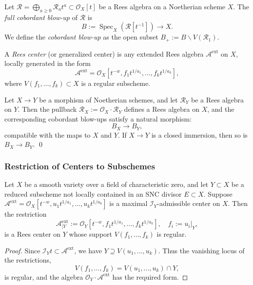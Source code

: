 \documentclass{amsart}
\newcommand{\ext}{{\operatorname{ext}}}
\newcommand{\Spec}{\operatorname{Spec}}
\renewcommand{\setminus}{\smallsetminus}
\begin{document}
\begin{definition}
Let $\mathcal{R} = \bigoplus_{a \geq 0} \mathcal{R}_a t^a \subset \mathcal{O}_X[t]$ be a Rees algebra on a Noetherian scheme $X$. The \emph{full cobordant blow-up} of $\mathcal{R}$ is
\[
B := \Spec_X(\mathcal{R}[t^{-1}]) \to X.
\]
We define the \emph{cobordant blow-up} as the open subset $B_+ := B \setminus V(\mathcal{R}_1)$.
\end{definition}

\begin{definition}
A \emph{Rees center} (or generalized center) is any extended Rees algebra $\mathcal{A}^{\ext}$ on $X$, locally generated in the form
\[
\mathcal{A}^{\ext} = \mathcal{O}_X[t^{-w}, f_1 t^{1/a_1}, \ldots, f_k t^{1/a_k}],
\]
where $V(f_1, \ldots, f_k) \subset X$ is a regular subscheme.
\end{definition}

\begin{lemma}
Let $X \to Y$ be a morphism of Noetherian schemes, and let $\mathcal{R}_Y$ be a Rees algebra on $Y$. Then the pullback $\mathcal{R}_X := \mathcal{O}_X \cdot \mathcal{R}_Y$ defines a Rees algebra on $X$, and the corresponding cobordant blow-ups satisfy a natural morphism:
\[
B_X \to B_Y,
\]
compatible with the maps to $X$ and $Y$. If $X \to Y$ is a closed immersion, then so is $B_X \to B_Y$. \qed
\end{lemma}

\subsubsection{Restriction of Centers to Subschemes}

\begin{lemma}
Let $X$ be a smooth variety over a field of characteristic zero, and let $Y \subset X$ be a reduced subscheme not locally contained in an SNC divisor $E \subset X$. Suppose $\mathcal{A}^{\ext} = \mathcal{O}_X[t^{-w}, u_1 t^{1/a_1}, \ldots, u_k t^{1/a_k}]$ is a maximal $\mathcal{I}_Y$-admissible center on $X$. Then the restriction
\[
\mathcal{A}^{\ext}_{|Y} := \mathcal{O}_Y[t^{-w}, f_1 t^{1/a_1}, \ldots, f_k t^{1/a_k}], \quad f_i := u_i|_Y,
\]
is a Rees center on $Y$ whose support $V(f_1, \ldots, f_k)$ is regular.
\end{lemma}

\begin{proof}
Since $\mathcal{I}_Y t \subset \mathcal{A}^{\ext}$, we have $Y \supseteq V(u_1, \ldots, u_k)$. Thus the vanishing locus of the restrictions,
\[
V(f_1, \ldots, f_k) = V(u_1, \ldots, u_k) \cap Y,
\]
is regular, and the algebra $\mathcal{O}_Y \cdot \mathcal{A}^{\ext}$ has the required form.
\end{proof}
\end{document}
